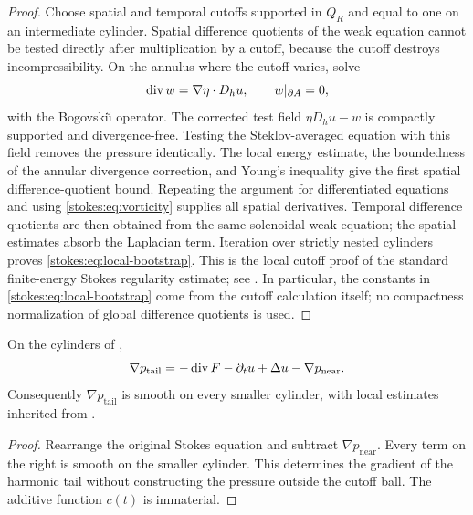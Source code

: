 \begin{proof}
Choose spatial and temporal cutoffs supported in \(Q_R\) and equal to one on
an intermediate cylinder.  Spatial difference quotients of the weak equation
cannot be tested directly after multiplication by a cutoff, because the
cutoff destroys incompressibility.  On the annulus where the cutoff varies,
solve
\[
 \operatorname{div} w=\nabla\eta\cdot D_hu,
 \qquad w|_{\partial A}=0,
\]
with the Bogovski\u\i{} operator.  The corrected test field
\(\eta D_hu-w\) is compactly supported and divergence-free.  Testing the
Steklov-averaged equation with this field removes the pressure identically.
The local energy estimate, the boundedness of the annular divergence
correction, and Young's inequality give the first spatial difference-quotient
bound.  Repeating the argument for differentiated equations and using
\eqref{stokes:eq:vorticity} supplies all spatial derivatives.  Temporal
difference quotients are then obtained from the same solenoidal weak equation;
the spatial estimates absorb the Laplacian term.  Iteration over strictly
nested cylinders proves \eqref{stokes:eq:local-bootstrap}.  This is the local
cutoff proof of the standard finite-energy Stokes regularity estimate; see
\cite[Chapters~II--III]{Sohr2001}.  In particular, the constants in
\eqref{stokes:eq:local-bootstrap} come from the cutoff calculation itself; no
compactness normalization of global difference quotients is used.
\end{proof}

\begin{lemma}
\label{stokes:lem:pressure-closure}
On the cylinders of ,
\[
 \nabla p_{\mathrm{tail}}
 =-\operatorname{div} F-\partial_tu+\Delta u-\nabla p_{\mathrm{near}}.
\]
Consequently \(\nabla p_{\mathrm{tail}}\) is smooth on every smaller
cylinder, with local estimates inherited from
.
\end{lemma}

\begin{proof}
Rearrange the original Stokes equation and subtract
\(\nabla p_{\mathrm{near}}\).  Every term on the right is smooth on the
smaller cylinder.  This determines the gradient of the harmonic tail without
constructing the pressure outside the cutoff ball.  The additive function
\(c(t)\) is immaterial.
\end{proof}

